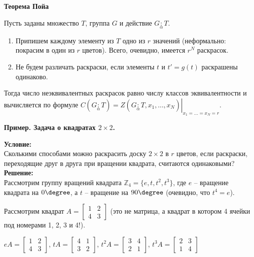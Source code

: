 \textbf{Теорема Пойа}

Пусть заданы множество $T$, группа $G$ и действие $G \underset{\alpha}{:}T$.
\begin{enumerate}
    \item Припишем каждому элементу из $T$ одно из $r$ значений (неформально: покрасим в один из $r$ цветов). Всего, очевидно, имеется $r^{N}$ раскрасок.
    \item Не будем различать раскраски, если элементы $t$ и $t' = g(t)$ раскрашены одинаково.
\end{enumerate}
Тогда число неэквивалентных раскрасок равно числу классов эквивалентности и вычисляется по формуле $C(G \underset{\alpha}{:}T) = \left . Z(G \underset{\alpha}{:}T, x_{1}, \dots, x_{N}) \right|_{x_{1} = \ldots = x_{N} = r}$.

\textbf{Пример. Задача о квадратах $2 \times 2$.}

\textbf{Условие:}\\
Сколькими способами можно раскрасить доску $2 \times 2$ в $r$ цветов, если раскраски, переходящие друг в друга при вращении квадрата, считаются одинаковыми?\\

\textbf{Решение:}\\
Рассмотрим группу вращений квадрата $\mathbb{Z}_{4} = \{e, t, t^{2}, t^{3}\}$, где $e$ -- вращение квадрата на $0\degree$, а $t$ -- вращение на $90\degree$ (очевидно, что $t^4 = e$).

Рассмотрим квадрат $A = \begin{bmatrix} 1 & 2 \\ 4 & 3 \end{bmatrix}$ (это не матрица, а квадрат в котором 4 ячейки под номерами 1, 2, 3 и 4!).

$eA = \begin{bmatrix} 1 & 2 \\ 4 & 3 \end{bmatrix}$,
$tA = \begin{bmatrix} 4 & 1 \\ 3 & 2 \end{bmatrix}$,
$t^{2}A = \begin{bmatrix} 3 & 4 \\ 2 & 1 \end{bmatrix}$,
$t^{3}A = \begin{bmatrix} 2 & 3 \\ 1 & 4 \end{bmatrix}$\\

